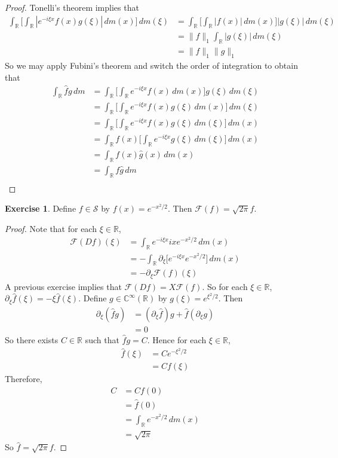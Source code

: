 \documentclass[12pt]{amsart}
\theoremstyle{definition}
\newtheorem{ex}[definition]{Exercise}
\newcommand{\p}{\partial}
\newcommand{\C}{\mathbb{C}}
\newcommand{\R}{\mathbb{R}}
\newcommand{\MF}{\mathcal{F}}
\newcommand{\MS}{\mathcal{S}}
\newcommand{\dm}{\, d m}
\begin{document}
	\begin{proof}
		Tonelli's theorem implies that  
		\begin{align*}
			\int_{\R} \bigg[ \int_{\R}|e^{-i \xi x} f(x) g(\xi)| \dm(x) \bigg] \dm(\xi)
			& = \int_{\R} \bigg[ \int_{\R}|f(x)| \dm(x) \bigg]  |g(\xi)| \dm(\xi) \\
			& = \|f\|_1 \int_{\R}  |g(\xi)| \dm(\xi) \\
			& = \|f\|_1\|g\|_1
		\end{align*}  
		So we may apply Fubini's theorem and switch the order of integration to obtain that
		\begin{align*}
			\int_{\R}\hat{f} g \dm 
			& = \int_{\R} \bigg[ \int_{\R}e^{-i \xi x} f(x) \dm(x) \bigg]  g(\xi) \dm(\xi) \\
			& = \int_{\R} \bigg[ \int_{\R}e^{-i \xi x} f(x) g(\xi) \dm(x) \bigg] \dm(\xi) \\
			& = \int_{\R} \bigg[ \int_{\R}e^{-i \xi x} f(x) g(\xi) \dm(\xi) \bigg] \dm(x) \\
			& = \int_{\R} f(x) \bigg[ \int_{\R}e^{-i \xi x}  g(\xi) \dm(\xi) \bigg] \dm(x) \\
			& = \int_{\R} f(x) \hat{g}(x) \dm(x) \\
			& = \int_{\R} f \hat{g} \dm \\
		\end{align*}
	\end{proof}


	\begin{ex}
		Define $f \in \MS$ by $f(x) = e^{-x^2/2}$. Then $\MF(f) = \sqrt{2 \pi}f$.
	\end{ex}

	\begin{proof}
		Note that for each $\xi \in \R$, 
		\begin{align*}
			\MF(Df)(\xi) 
			& = \int_{\R} e^{-i \xi x}ixe^{-x^2/2} \dm(x) \\
			& = -\int_{\R}  \p_{\xi} \bigg[ e^{-i \xi x} e^{-x^2/2}\bigg] \dm(x) \\
			& = - \p_{\xi} \MF(f)(\xi) 
		\end{align*}
		A previous exercise implies that $\MF(Df) = X \MF(f)$. So for each $\xi \in \R$, $\p_{\xi} \hat{f}(\xi) = - \xi \hat{f}(\xi)$. Define $g \in \C^{\infty}(\R)$ by $g(\xi) = e^{\xi^2/2}$. Then 
		\begin{align*}
			\p_{\xi} (\hat{f} g) 
			& = (\p_{\xi} \hat{f}) g + \hat{f} (\p_{\xi}g) \\
			& = 0
		\end{align*}
		So there exists $C \in \R$ such that $\hat{f}g = C$. Hence for each $\xi \in \R$, 
		\begin{align*}
			\hat{f}(\xi) 
			& = Ce^{-\xi^2/2} \\
			& = Cf(\xi)
		\end{align*}
		Therefore, 
		\begin{align*}
			C
			& = Cf(0) \\
			& = \hat{f}(0) \\
			& = \int_{\R} e^{-x^2/2} \dm(x) \\
			& = \sqrt{2 \pi} 
		\end{align*}
		So $\hat{f} = \sqrt{2 \pi}f$.
	\end{proof}
\end{document}
